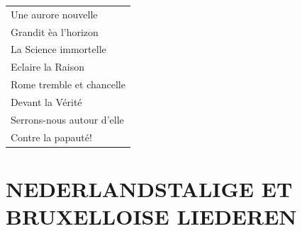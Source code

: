 \documentclass{article}
\begin{document}
\begin{flushleft}
\begin{tabularx}{0.7\textwidth} {
   >{\raggedright\arraybackslash}X }
Une aurore nouvelle\\
Grandit èa l’horizon\\
La Science immortelle\\
Eclaire la Raison\\
Rome tremble et chancelle\\
Devant la Vérité\\
Serrons-nous autour d’elle\\
Contre la papauté!\\
\end{tabularx}
\end{flushleft}
\newpage
\section*{NEDERLANDSTALIGE ET BRUXELLOISE LIEDEREN}
\end{document}
